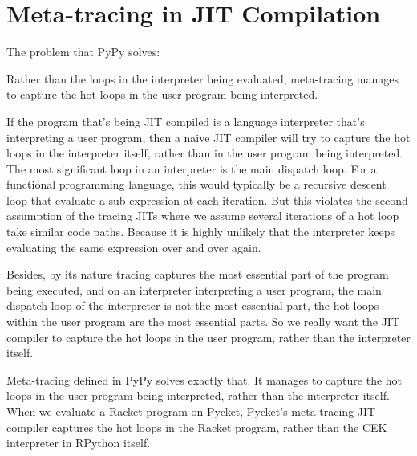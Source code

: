     \section{Meta-tracing in JIT Compilation}
        \begin{mainpoint}
            The problem that PyPy solves:

            Rather than the loops in the interpreter being evaluated, meta-tracing manages to capture the hot loops in the user program being interpreted.
        \end{mainpoint}

        \begin{paragraph-here}
            If the program that's being JIT compiled is a language interpreter that's interpreting a user program, then a naive JIT compiler will try to capture the hot loops in the interpreter itself, rather than in the user program being interpreted. The most significant loop in an interpreter is the main dispatch loop. For a functional programming language, this would typically be a recursive descent loop that evaluate a sub-expression at each iteration. But this violates the second assumption of the tracing JITs where we assume several iterations of a hot loop take similar code paths. Because it is highly unlikely that the interpreter keeps evaluating the same expression over and over again.
        \end{paragraph-here}

        \begin{paragraph-here}
            Besides, by its nature tracing captures the most essential part of the program being executed, and on an interpreter interpreting a user program, the main dispatch loop of the interpreter is not the most essential part, the hot loops within the user program are the most essential parts. So we really want the JIT compiler to capture the hot loops in the user program, rather than the interpreter itself.
        \end{paragraph-here}

        \begin{paragraph-here}
            Meta-tracing defined in PyPy \cite{pypy-main} solves exactly that. It manages to capture the hot loops in the user program being interpreted, rather than the interpreter itself. When we evaluate a Racket program on Pycket, Pycket's meta-tracing JIT compiler captures the hot loops in the Racket program, rather than the CEK interpreter in RPython itself.
        \end{paragraph-here}